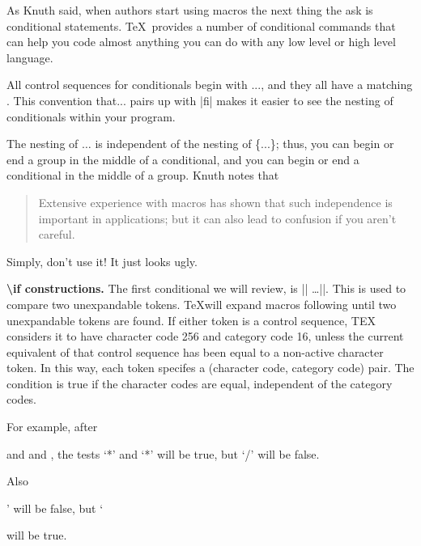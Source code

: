 \begin{multicols}{2}
As Knuth said, when authors start using macros the next thing the ask is conditional statements.
\TeX\  provides a number of  conditional commands that can help you code almost anything you can do with any low level or high level language.

All  control sequences for conditionals begin with ...,
and they all have a matching . This convention that... pairs up
with |fi| makes it easier to see the nesting of conditionals within your program. 

The nesting of $\ldots$  is independent of the nesting of \{...\}; thus, you can begin or end
a group in the middle of a conditional, and you can begin or end a conditional in the
middle of a group. Knuth notes that

\begin{quotation}
Extensive experience with macros has shown that such independence
is important in applications; but it can also lead to confusion if you aren't careful.
\end{quotation}\sidenote{\TODO}

Simply, don't use it! It just looks ugly.



\textbf{\textbackslash if constructions.} \quad The first conditional we will review, is |\if| \ldots |\fi|. This is used to compare two unexpandable tokens. \TeX will expand macros following  until two unexpandable tokens are found. If
either token is a control sequence, TEX considers it to have character code 256 and
category code 16, unless the current equivalent of that control sequence has been 
  equal to a non-active character token. In this way, each token specifes a (character
code, category code) pair. The condition is true if the character codes are equal,
independent of the category codes.

 For example, after 
\end{multicols}

\begin{teXXX}
\def\a{*} and \let\b=* and \def\c{/}, 
the tests `\if*\a \fi' and `\if\a\b \fi' will be true, 
but `\if\a\c \fi' will be false.

Also \if\a\par\fi' will be false, 
but `\if\par\let \fi' will be true.

\end{teXXX}

